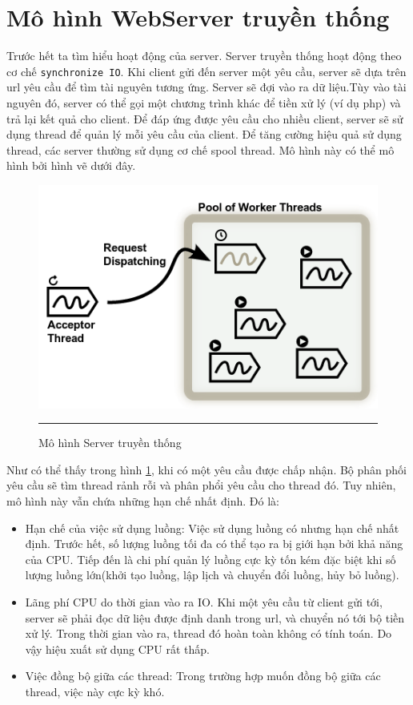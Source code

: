 \documentclass[a4paper,12pt]{report}
\begin{document}
    \section{Mô hình WebServer truyền thống}
    Trước hết ta tìm hiểu hoạt động của server.  Server truyền thống hoạt động theo cơ chế \texttt{synchronize IO}. Khi client gửi đến server một yêu cầu, server sẽ dựa trên url yêu cầu để tìm tài nguyên tương ứng. Server sẽ đợi vào ra dữ liệu.Tùy vào tài nguyên đó, server có thể gọi một chương trình khác để tiền xử lý (ví dụ php) và trả lại kết quả cho client. Để đáp ứng được yêu cầu cho nhiều client, server sẽ sử dụng thread để quản lý mỗi yêu cầu của client. Để tăng cường hiệu quả sử dụng thread, các server thường sử dụng cơ chế spool thread. Mô hình này có thể mô hình bởi hình vẽ dưới đây. \\
	\begin{figure}
        \centering
        \includegraphics[scale=0.7]{io}
        \rule{35em}{0.5pt}
        \caption{Mô hình Server truyền thống}
        \label{fig:io}
    \end{figure}
	Như có thể thấy trong hình \ref{fig:io}, khi có một yêu cầu được chấp nhận. Bộ phân phối yêu cầu sẽ tìm thread rảnh rỗi và phân phổi yêu cầu cho thread đó.
	Tuy nhiên, mô hình này vẫn chứa những hạn chế nhất định. Đó là: \\
	\begin{itemize}
		\item Hạn chế của  việc sử dụng luồng: Việc sử dụng luồng có nhưng hạn chế nhất định. Trước hết, số lượng luồng tối đa có thể tạo ra bị giới hạn bởi khả năng của CPU. Tiếp đến là chi phí quản lý luồng cực kỳ tốn kém đặc biệt khi số lượng luồng lớn(khởi tạo luồng, lập lịch và chuyển đổi luồng, hủy bỏ luồng).
		\item Lãng phí CPU do thời gian vào ra IO. Khi một yêu cầu từ client gửi tới, server sẽ phải đọc dữ liệu được định danh trong url, và chuyển nó tới bộ tiền xử lý. Trong thời gian vào ra, thread đó hoàn toàn không có tính toán. Do vậy hiệu xuất sử dụng CPU rất thấp.
		\item Việc đồng bộ giữa các thread: Trong trường hợp  muốn đồng bộ giữa các thread, việc này cực kỳ khó.
	\end{itemize}
\end{document}
